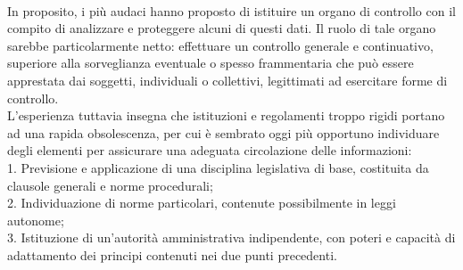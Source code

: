 \\In proposito, i più audaci hanno proposto di istituire un organo di controllo con il compito di analizzare e proteggere alcuni di questi dati. 
Il ruolo di tale organo sarebbe particolarmente netto: effettuare un controllo generale e continuativo, superiore alla sorveglianza eventuale o spesso frammentaria che può essere apprestata dai soggetti, individuali o collettivi, legittimati ad esercitare forme di controllo.
\\L'esperienza tuttavia insegna che istituzioni e regolamenti troppo rigidi portano ad una rapida obsolescenza, per cui è sembrato oggi più opportuno individuare degli elementi per assicurare una adeguata circolazione delle informazioni:
\\1. Previsione e applicazione di una disciplina legislativa di base, costituita da clausole generali e norme procedurali;
\\2. Individuazione di norme particolari, contenute possibilmente in leggi autonome;
\\3. Istituzione di un'autorità amministrativa indipendente, con poteri e capacità di adattamento dei principi contenuti nei due punti precedenti.
